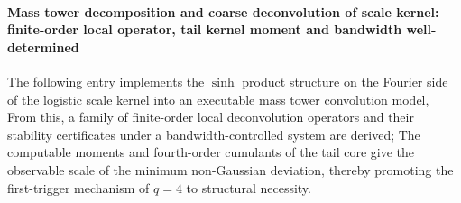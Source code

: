 
\paragraph{Mass tower decomposition and coarse deconvolution of scale kernel: finite-order local operator, tail kernel moment and bandwidth well-determined}
The following entry implements the \(\sinh\) product structure on the Fourier side of the logistic scale kernel into an executable mass tower convolution model,
From this, a family of finite-order local deconvolution operators and their stability certificates under a bandwidth-controlled system are derived;
The computable moments and fourth-order cumulants of the tail core give the observable scale of the minimum non-Gaussian deviation, thereby promoting the first-trigger mechanism of \(q=4\) to structural necessity.

